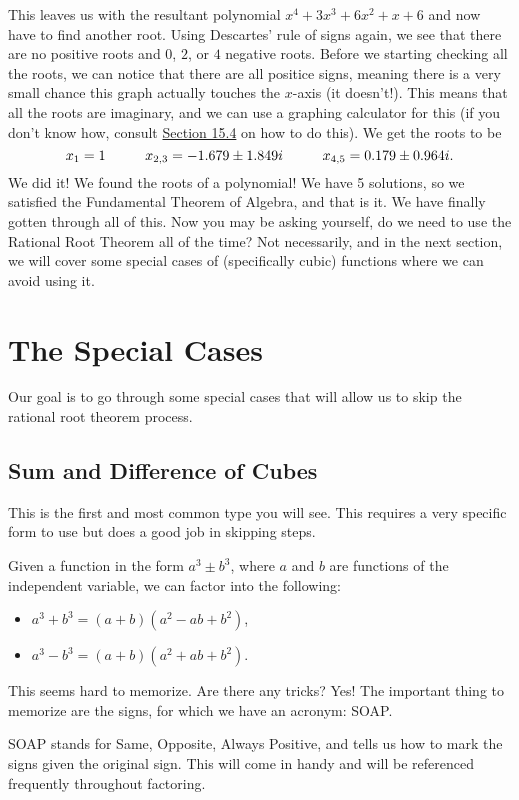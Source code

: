 \documentclass[lang=en,11pt]{elegantbook}
\begin{document}

This leaves us with the resultant polynomial $x^4+3x^3+6x^2+x+6$ and now have to find another root.  Using Descartes' rule of signs again, we see that there are no positive roots and $0$, $2$, or $4$ negative roots.  Before we starting checking all the roots, we can notice that there are all positice signs, meaning there is a very small chance this graph actually touches the $x$-axis (it doesn't!). This means that all the roots are imaginary, and we can use a graphing calculator for this (if you don't know how, consult \hyperlink{section.15.4}{Section 15.4} on how to do this).  We get the roots to be $$x_1=1 \hspace{10mm} x_{2,3}=-1.679\pm 1.849i \hspace{10mm} x_{4,5}=0.179\pm 0.964i.$$ 
We did it! We found the roots of a polynomial! We have 5 solutions, so we satisfied the Fundamental Theorem of Algebra, and that is it. We have finally gotten through all of this. Now you may be asking yourself, do we need to use the Rational Root Theorem all of the time? Not necessarily, and in the next section, we will cover some special cases of (specifically cubic) functions where we can avoid using it. 
\section{The Special Cases}
\noindent Our goal is to go through some special cases that will allow us to skip the rational root theorem process.
\subsection{Sum and Difference of Cubes}
\noindent This is the first and most common type you will see.  This requires a very specific form to use but does a good job in skipping steps. 

Given a function in the form $a^3\pm b^3$, where $a$ and $b$ are functions of the independent variable, we can factor into the following: \begin{itemize}
    \item $a^3+b^3=(a+b)(a^2-ab+b^2)$,
    \item $a^3-b^3=(a+b)(a^2+ab+b^2)$.
\end{itemize}
This seems hard to memorize.  Are there any tricks? Yes! The important thing to memorize are the signs, for which we have an acronym: SOAP.

SOAP stands for Same, Opposite, Always Positive, and tells us how to mark the signs given the original sign.  This will come in handy and will be referenced frequently throughout factoring.
\end{document}
